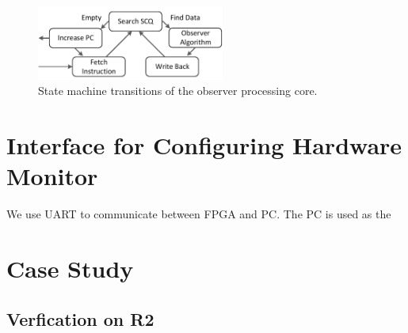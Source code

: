 \begin{figure}
\centering
\includegraphics[width=0.55\textwidth]{fig/wf.pdf}
\caption{\label{fig:wf}State machine transitions of the observer processing core.}
\end{figure}


\section*{Interface for Configuring Hardware Monitor}
We use UART to communicate between FPGA and PC. The PC is used as the 


\section*{Case Study}
\subsection{Verfication on R2}


